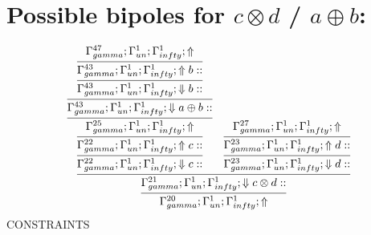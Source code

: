 \documentclass[a4paper, 11pt]{article}
\begin{document}
\section{Possible bipoles for $c \otimes d$ / $a \oplus b$:} 

{\small
\[
\infer{\Gamma_{ gamma}^{20} ; \Gamma_{un}^{1} ; \Gamma_{ infty}^{1} ;  \Uparrow }
{\infer{\Gamma_{ gamma}^{21} ; \Gamma_{un}^{1} ; \Gamma_{ infty}^{1} ;  \Downarrow c \otimes d :: }
{\infer{\Gamma_{ gamma}^{22} ; \Gamma_{un}^{1} ; \Gamma_{ infty}^{1} ;  \Downarrow c :: }
{\infer{\Gamma_{ gamma}^{22} ; \Gamma_{un}^{1} ; \Gamma_{ infty}^{1} ;  \Uparrow c :: }
{\infer{\Gamma_{ gamma}^{25} ; \Gamma_{un}^{1} ; \Gamma_{ infty}^{1} ;  \Uparrow }
{\infer{\Gamma_{ gamma}^{43} ; \Gamma_{un}^{1} ; \Gamma_{ infty}^{1} ;  \Downarrow a \oplus b :: }
{\infer{\Gamma_{ gamma}^{43} ; \Gamma_{un}^{1} ; \Gamma_{ infty}^{1} ;  \Downarrow b :: }
{\infer{\Gamma_{ gamma}^{43} ; \Gamma_{un}^{1} ; \Gamma_{ infty}^{1} ;  \Uparrow b :: }
{\Gamma_{ gamma}^{47} ; \Gamma_{un}^{1} ; \Gamma_{ infty}^{1} ;  \Uparrow }}}}}}
&
\infer{\Gamma_{ gamma}^{23} ; \Gamma_{un}^{1} ; \Gamma_{ infty}^{1} ;  \Downarrow d :: }
{\infer{\Gamma_{ gamma}^{23} ; \Gamma_{un}^{1} ; \Gamma_{ infty}^{1} ;  \Uparrow d :: }
{\Gamma_{ gamma}^{27} ; \Gamma_{un}^{1} ; \Gamma_{ infty}^{1} ;  \Uparrow }}}}
\]
}
CONSTRAINTS
\end{document}
